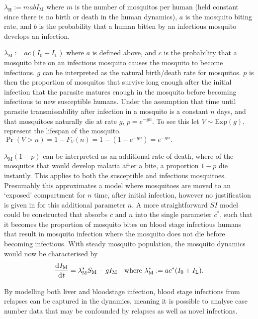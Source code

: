 $\lambda_\mathrm{H} := mabI_\mathrm{M}$ where $m$ is the number of mosquitos
per human (held constant since there is no birth or death in the human
dynamics), $a$ is the mosquito biting rate, and $b$ is the probability that a
human bitten by an infectious mosquito develops an infection.

$\lambda_\mathrm{M} := ac(I_0 + I_\mathrm{L})$ where $a$ is defined above,
and $c$ is the probability that a mosquito bite on an infectious mosquito
causes the mosquito to become infectious. $g$ can be interpreted as the natural
birth/death rate for mosquitos. $p$ is then the proportion of mosquitos that
survive long enough after the initial infection that the parasite matures
enough in the mosquito before becoming infectious to new susceptible humans.
Under the assumption that time until parasite transmissability after
infection in a mosquito is a constant $n$ days, and that mosquitoes naturally
die at rate $g$, $p=e^{-gn}.$ To see this let $V\sim\mathrm{Exp}(g),$
represent the lifespan of the mosquito.
$\Pr(V > n)= 1 - F_V(n) = 1 - (1 - e^{-gn}) = e^{-gn}.$

$\lambda_\mathrm{M}(1 - p)$ can be interpreted as an additional rate of death,
where of the mosquitos that would develop malaria after a bite, a proportion
$1 - p$ die instantly. This applies to both the susceptible and infectious
mosquitoes. Presumably this approximates a model where mosquitoes are moved
to an `exposed' compartment for $n$ time, after initial infection,
however no justification is given in \parencite{white_variation_2016} for
this additional parameter $n$. A more straightforward $SI$ model could be
constructed that absorbs $c$ and $n$ into the single parameter $c^*$, such
that it becomes the proportion of mosquito bites on blood stage infectious
humans that result in mosquito infection where the mosquito does not die
before becoming infectious. With steady mosquito population, the mosquito
dynamics would now be characterised by
$$
    \frac{\diff I_\mathrm{M}}{\diff t}
    = \lambda_\mathrm{M}^*S_\mathrm{M} - gI_\mathrm{M}
    \quad\text{where } \lambda_\mathrm{M}^*:= ac^*(I_0 + I_\mathrm{L}).
$$

By modelling both liver and bloodstage infection, blood stage infections
from relapses can be captured in the dynamics, meaning it is possible to
analyse case number data that may be confounded by relapses as well as
novel infections.


